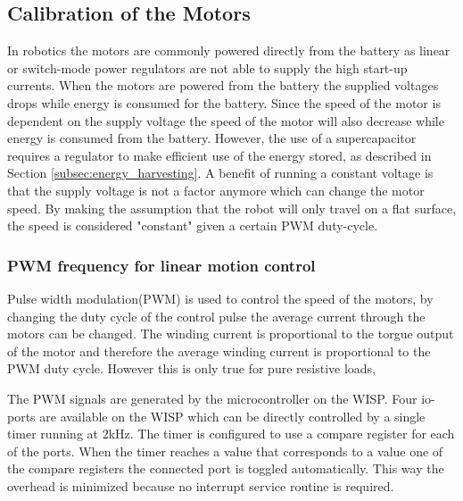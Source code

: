 
\subsection{Calibration of the Motors}
\label{subsub:motor_calib}

In robotics the motors are commonly powered directly from the battery as linear or switch-mode power regulators are not able to supply the high start-up currents.
When the motors are powered from the battery the supplied voltages drops while energy is consumed for the battery.
Since the speed of the motor is dependent on the supply voltage the speed of the motor will also decrease while energy is consumed from the battery.
However, the use of a supercapacitor requires a regulator to make efficient use of the energy stored, as described in Section \ref{subsec:energy_harvesting}.
A benefit of running a constant voltage is that the supply voltage is not a factor anymore which can change the motor speed.
By making the assumption that the robot will only travel on a flat surface, the speed is considered "constant" given a certain PWM duty-cycle.


\subsubsection{PWM frequency for linear motion control}

Pulse width modulation(PWM) is used to control the speed of the motors, by changing the duty cycle of the control pulse the average current through the motors can be changed.
The winding current is proportional to the torgue output of the motor and therefore the average winding current is proportional to the PWM duty cycle.
However this is only true for pure resistive loads,


The PWM signals are generated by the microcontroller on the WISP.
Four io-ports are available on the WISP which can be directly controlled by a single timer running at 2kHz.
The timer is configured to use a compare register for each of the ports.
When the timer reaches a value that corresponds to a value one of the compare registers the connected port is toggled automatically.
This way the overhead is minimized because no interrupt service routine is required.

